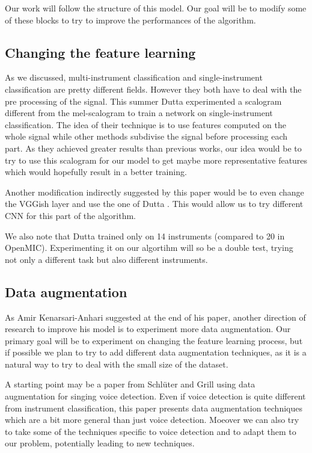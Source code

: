 \documentclass[final]{cvpr}
\begin{document}
Our work will follow the structure of this model. Our goal will be to modify some of these blocks to try to improve the performances of the algorithm.
\subsection{Changing the feature learning}
As we discussed, multi-instrument classification and single-instrument classification are pretty different fields. However they both have to deal with the pre processing of the signal. This summer Dutta \etal \cite{features_descr} experimented a scalogram different from the mel-scalogram to train a network on single-instrument classification. The idea of their technique is to use features computed on the whole signal while other methods subdivise the signal before processing each part. As they achieved greater results than previous works, our idea would be to try to use this scalogram for our model to get maybe more representative features which would hopefully result in a better training. 

Another modification indirectly suggested by this paper would be to even change the VGGish layer and use the one of Dutta \etal. This would allow us to try different CNN for this part of the algorithm.

We also note that Dutta \etal trained only on 14 instruments (compared to 20 in OpenMIC). Experimenting it on our algortihm will so be a double test, trying not only a different task but also different instruments.
\subsection{Data augmentation}
As Amir Kenarsari-Anhari suggested at the end of his paper, another direction of research to improve his model is to experiment more data augmentation. Our primary goal will be to experiment on changing the feature learning process, but if possible we plan to try to add different data augmentation techniques, as it is a natural way to try to deal with the small size of the dataset. 

A starting point may be a paper from Schlüter and Grill \cite{data_aug} using data augmentation for singing voice detection. Even if voice detection is quite different from instrument classification, this paper presents data augmentation techniques which are a bit more general than just voice detection. Moeover we can also try to take some of the techniques specific to voice detection and to adapt them to our problem, potentially leading to new techniques.
\end{document}
